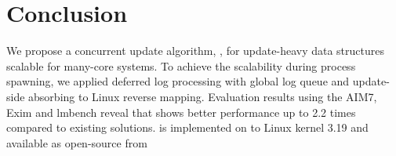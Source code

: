 \section{Conclusion}

\ifkor

We propose a concurrent update algorithm, , for update-heavy data structures 
scalable for many-core systems.
To achieve the scalability during process spawning, 
we applied deferred log processing with global log queue and 
update-side absorbing to Linux reverse mapping.
Evaluation results using the AIM7, Exim and lmbench reveal that  shows
better performance up to 2.2 times compared to existing solutions.
 is implemented on to Linux kernel 3.19 and available as open-source from
\else

\fi

